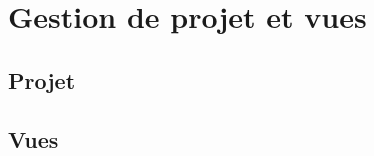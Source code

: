 
\chapter{Gestion de projet et vues}
\label{ch:gestion_projet}


\section{Projet}
\label{sec:projet}


\section{Vues}
\label{sec:vues}
